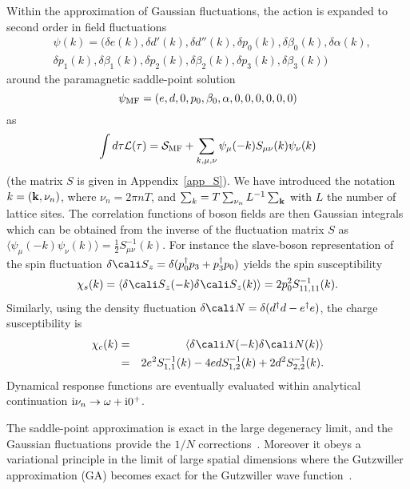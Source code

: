 \documentclass[showpacs,amsmath,twocolumn,floatfix]{revtex4-1}
\newcommand\dd{\delta\:\!}
\begin{document}
Within the approximation of Gaussian fluctuations, the action is 
expanded to second order in field fluctuations 
\begin{eqnarray}
&\psi(k) = \big(\delta e(k),\delta d'(k),\delta d''(k),\delta p_{0}(k),
\delta \beta_{0}(k), \delta \alpha(k), \nonumber \\ 
& \delta p_{1}(k),\delta \beta_{1}(k),\delta p_{2}(k),\delta \beta_{2}(k),
\delta p_{3}(k), \delta \beta_{3}(k) \big)
\end{eqnarray}
around the paramagnetic saddle-point solution 
\begin{equation}
\psi_{\rm MF} = (e, d, 0, p_0,\beta_0,\alpha, 0,0,0,0,0,0)
\end{equation}
as
\begin{equation}
 \int d\tau {\cal L}(\tau) = {\cal S}_{\rm MF} + \sum_{k,\mu,\nu} \psi_{\mu}(-k) 
 S_{\mu\nu}(k) \psi_{\nu}(k)
\end{equation}
(the matrix $S$ is given in Appendix~\ref{app_S}). We have introduced the 
notation $k=({\bf k},\nu_n)$, where $\nu_n=2\pi nT$, and 
$\sum_k = T \sum_{\nu_n} L^{-1} \sum_{{\bf k}}$ with $L$ the number of 
lattice sites. The correlation functions of boson fields are then 
Gaussian integrals which can be obtained from the inverse of the fluctuation 
matrix $S$ as 
$\langle \psi_{\mu}(-k) \psi_{\nu}(k) \rangle = \frac{1}{2} S^{-1}_{\mu\nu}(k)$. 
For instance the slave-boson representation of the spin fluctuation 
$\delta {\cali S}_z = \delta(p_0^{\dagger} p_3 + p_3^{\dagger} p_0)$ 
yields the spin susceptibility
\begin{equation}
 \chi_s(k)  =  \langle \dd {\cali S}_z(-k) \dd {\cali S}_z(k) \rangle = 2 p_0^2 
 S_{11,11}^{-1}(k) .
\end{equation}
Similarly, using the density fluctuation 
$\delta {\cali N} = \delta(d^{\dagger} d - e^{\dagger} e) $, 
the charge susceptibility is
\begin{eqnarray}
 \chi_c(k) & = & \langle \dd {\cali N}(-k) \dd {\cali N}(k) \rangle \nonumber \\
 &  = & 2 e^2 S_{1,1}^{-1}(k) - 4 e d S_{1,2}^{-1}(k) + 2 d^2  S_{2,2}^{-1}(k) .
 \label{eq:chi_c-def}
\end{eqnarray}
Dynamical response functions are eventually evaluated within analytical 
continuation ${\rm i} \nu_n \rightarrow \omega + {\rm i} 0^+$. 

 

The saddle-point approximation is exact in the large degeneracy limit, 
and the Gaussian fluctuations provide the $1/N$ corrections~\cite{FW}. 
Moreover it obeys a variational principle in the limit of large spatial 
dimensions where the Gutzwiller approximation (GA) becomes exact for the 
Gutzwiller wave function~\cite{Met89}. 
 
\end{document}
